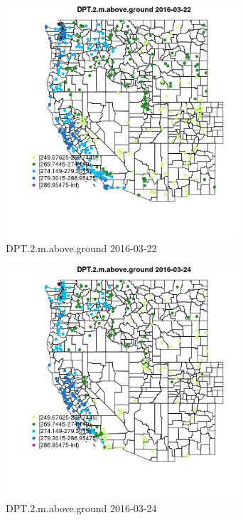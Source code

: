 \begin{figure} 
\centering  
\includegraphics[width=0.77\textwidth]{Code_Outputs/Report_ML_input_PM25_Step4_part_e_de_duplicated_aveswNAs_MapObsDPT2maboveground2016-03-22.jpg} 
\caption{\label{fig:Report_ML_input_PM25_Step4_part_e_de_duplicated_aveswNAsMapObsDPT2maboveground2016-03-22}DPT.2.m.above.ground 2016-03-22} 
\end{figure} 
 

\clearpage 

\begin{figure} 
\centering  
\includegraphics[width=0.77\textwidth]{Code_Outputs/Report_ML_input_PM25_Step4_part_e_de_duplicated_aveswNAs_MapObsDPT2maboveground2016-03-24.jpg} 
\caption{\label{fig:Report_ML_input_PM25_Step4_part_e_de_duplicated_aveswNAsMapObsDPT2maboveground2016-03-24}DPT.2.m.above.ground 2016-03-24} 
\end{figure} 
 

